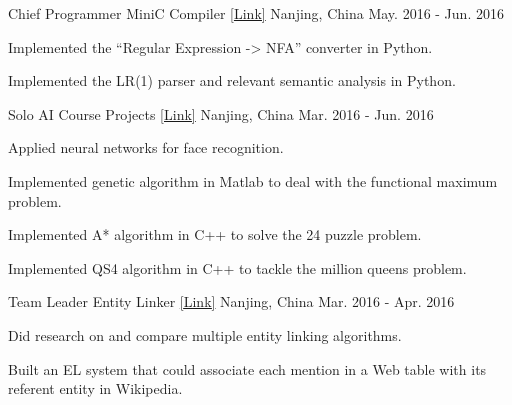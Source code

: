 \begin{cventries}
  \cventry
    {Chief Programmer} %
    {MiniC Compiler \href{https://github.com/seucs/compiler}{[\underline{Link}]}} %
    {Nanjing, China} %
    {May. 2016 - Jun. 2016} %
    {
      \begin{cvitems} %
        \item {Implemented the ``Regular Expression -> NFA'' converter in Python.}
        \item {Implemented the LR(1) parser and relevant semantic analysis in Python.}
      \end{cvitems}
    }

  \cventry
    {Solo} %
    {AI Course Projects \href{https://github.com/yanshengjia/artificial-intelligence}{[\underline{Link}]}} %
    {Nanjing, China} %
    {Mar. 2016 - Jun. 2016} %
    {
      \begin{cvitems} %
        \item {Applied neural networks for face recognition.}
        \item {Implemented genetic algorithm in Matlab to deal with the functional maximum problem.}
        \item {Implemented A* algorithm in C++ to solve the 24 puzzle problem.}
        \item {Implemented QS4 algorithm in C++ to tackle the million queens problem.}
      \end{cvitems}
    }

  \cventry
    {Team Leader} %
    {Entity Linker \href{https://github.com/acmom/entity-linker}{[\underline{Link}]}} %
    {Nanjing, China} %
    {Mar. 2016 - Apr. 2016} %
    {
      \begin{cvitems} %
        \item {Did research on and compare multiple entity linking algorithms.}
        \item {Built an EL system that could associate each mention in a Web table with its referent entity in Wikipedia.}
      \end{cvitems}
    }



\end{cventries}
